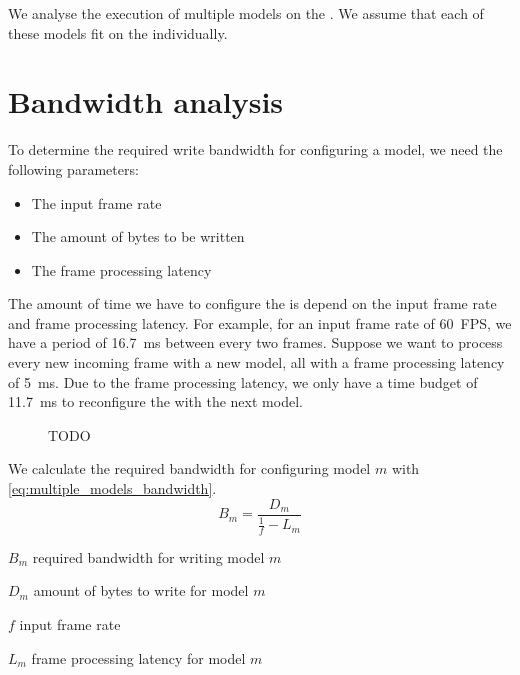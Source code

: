 We analyse the execution of multiple models on the \graicore{}.
We assume that each of these models fit on the \graicore{} individually.

\section{Bandwidth analysis}

To determine the required write bandwidth for configuring a model, we need the following parameters:
\begin{itemize}
    \item The input frame rate
    \item The amount of bytes to be written
    \item The frame processing latency
\end{itemize}

The amount of time we have to configure the \graicore{} is depend on the input frame rate and frame processing latency.
For example, for an input frame rate of \SI{60}{FPS}, we have a period of \SI{16.7}{ms} between every two frames.
Suppose we want to process every new incoming frame with a new model, all with a frame processing latency of \SI{5}{ms}. 
Due to the frame processing latency, we only have a time budget of \SI{11.7}{ms} to reconfigure the \graicore{} with the next model.

\begin{figure}[htbp]
    \centering
    
    \caption{TODO}
    \label{fig:reconfig_time_line_ex3}
\end{figure}

We calculate the required bandwidth for configuring model $m$ with \cref{eq:multiple_models_bandwidth}.
\begin{equation}
    B_m = \frac{D_m}{\frac{1}{f} - L_m}
    \label{eq:multiple_models_bandwidth}
\end{equation}

\begin{eqexpl}[15mm]
    \item{$B_m$} required bandwidth for writing model $m$
    \item{$D_m$} amount of bytes to write for model $m$
    \item{$f$} input frame rate
    \item{$L_m$} frame processing latency for model $m$
\end{eqexpl}

